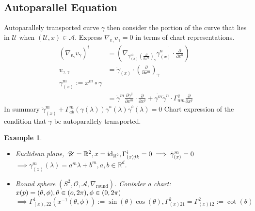 \documentclass[10pt, oneside]{article}
\newcommand{\R}{\mathbb{R}}
\newtheorem{example}{Example}
\begin{document}
   \subsection{Autoparallel Equation}
   Autoparallely transported curve $\gamma$ then consider the portion of the curve that lies in $\mathcal{U}$ when $(\mathcal{U},x) \in \mathcal{A}$. Express $\nabla_{v_{\gamma}} v_\gamma = 0$ in terms of chart representations. 
   \begin{align*}
      (\nabla_{v_\gamma} v_\gamma)^i &= (\nabla_{\dot{\gamma^m_{(x)}} (\frac{\partial}{\partial x^m})_{\gamma}} \dot{\gamma^n_{(x)}\cdot \frac{\partial}{\partial x^n}}) \\
      v_{\gamma, \gamma } &= \dot{\gamma}_{(x)}^, \cdot (\frac{\partial}{\partial x^m})_{\gamma} \\
      \gamma^m_{(x)} := x^m \circ \gamma \\
      &= \dot{\gamma}^m \frac{\partial \dot{\gamma}^q}{\partial x^m} \cdot \frac{\partial}{\partial x^q} + \dot{\gamma^m} \dot{\gamma}^n \cdot \Gamma^q_{nm} \frac{\partial}{\partial x^q}
      \end{align*}
      In summary $\ddot{\gamma}_{(x)}^m + \Gamma^m_{ab} (\gamma(\lambda))\dot{\gamma}^a(\lambda) \dot{\gamma}^b (\lambda)= 0$ Chart expression of the condition that $\gamma$ be autoparallely transported. 
      \begin{example}
      \begin{itemize}
      \item Euclidean plane, $\mathcal{U} = \R^2, x = \text{id}_{\R^2}, \Gamma_{(x)jk}^i = 0 \implies \ddot{\gamma}_{(x)}^m = 0 \\$ $\implies \gamma^m_{(x)}(\lambda) = a^m \lambda + b^m, a,b \in \R^d$. 
      \item Round sphere $(S^2,\mathcal{O},\mathcal{A},\nabla_{\text{round}})$. Conisder a chart: $x(p) = (\theta, \phi), \theta \in (o,2 \pi), \phi \in (0,2 \pi) \\$ $\implies \Gamma_{(x),22}^1 (x^{-1}(\theta,\phi)):= \sin (\theta) \cos (\theta), \Gamma_{(x)21}^2 = \Gamma_{(x)12}^2 := \cot(\theta)$
      \end{itemize}
      \end{example}
\end{document}
